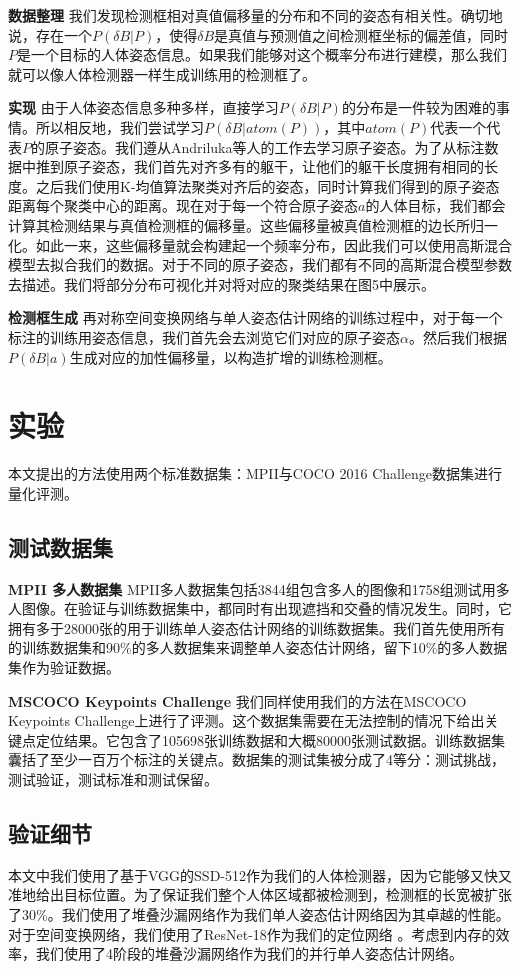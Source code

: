 \textbf{数据整理} 我们发现检测框相对真值偏移量的分布和不同的姿态有相关性。确切地说，存在一个$P(\delta B|P)$，使得$\delta B$是真值与预测值之间检测框坐标的偏差值，同时$P$是一个目标的人体姿态信息。如果我们能够对这个概率分布进行建模，那么我们就可以像人体检测器一样生成训练用的检测框了。

\textbf{实现} 由于人体姿态信息多种多样，直接学习$P(\delta B|P)$的分布是一件较为困难的事情。所以相反地，我们尝试学习$P(\delta B|atom(P))$，其中$atom(P)$代表一个代表$P$的原子姿态。我们遵从Andriluka等人的工作去学习原子姿态。为了从标注数据中推到原子姿态，我们首先对齐多有的躯干，让他们的躯干长度拥有相同的长度。之后我们使用K-均值算法聚类对齐后的姿态，同时计算我们得到的原子姿态距离每个聚类中心的距离。现在对于每一个符合原子姿态$a$的人体目标，我们都会计算其检测结果与真值检测框的偏移量。这些偏移量被真值检测框的边长所归一化。如此一来，这些偏移量就会构建起一个频率分布，因此我们可以使用高斯混合模型去拟合我们的数据。对于不同的原子姿态，我们都有不同的高斯混合模型参数去描述。我们将部分分布可视化并对将对应的聚类结果在图5中展示。

\textbf{检测框生成} 再对称空间变换网络与单人姿态估计网络的训练过程中，对于每一个标注的训练用姿态信息，我们首先会去浏览它们对应的原子姿态$\alpha$。然后我们根据$P(\delta B|a)$生成对应的加性偏移量，以构造扩增的训练检测框。

\section*{实验}
本文提出的方法使用两个标准数据集：MPII与COCO 2016 Challenge数据集进行量化评测。

\subsection*{测试数据集}
\textbf{MPII 多人数据集} MPII多人数据集包括3844组包含多人的图像和1758组测试用多人图像。在验证与训练数据集中，都同时有出现遮挡和交叠的情况发生。同时，它拥有多于28000张的用于训练单人姿态估计网络的训练数据集。我们首先使用所有的训练数据集和90\%的多人数据集来调整单人姿态估计网络，留下10\%的多人数据集作为验证数据。

\textbf{MSCOCO Keypoints Challenge} 我们同样使用我们的方法在MSCOCO Keypoints Challenge上进行了评测。这个数据集需要在无法控制的情况下给出关键点定位结果。它包含了105698张训练数据和大概80000张测试数据。训练数据集囊括了至少一百万个标注的关键点。数据集的测试集被分成了4等分：测试挑战，测试验证，测试标准和测试保留。

\subsection*{验证细节}
本文中我们使用了基于VGG的SSD-512作为我们的人体检测器，因为它能够又快又准地给出目标位置。为了保证我们整个人体区域都被检测到，检测框的长宽被扩张了30\%。我们使用了堆叠沙漏网络作为我们单人姿态估计网络因为其卓越的性能。对于空间变换网络，我们使用了ResNet-18作为我们的定位网络 。考虑到内存的效率，我们使用了4阶段的堆叠沙漏网络作为我们的并行单人姿态估计网络。

